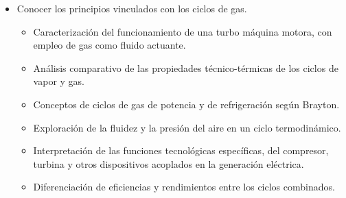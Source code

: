 \documentclass[../main]{subfiles}
\begin{document}
\begin{enumerate}
\begin{itemize}
        en los ciclos de vapor.
        \begin{itemize}
          \item Caracterización de las transformaciones de un sistema
            gaseoso.
          \item Interpretación del fenómeno de vaporización, a través de
            diagramas, representación, con usos de tablas de vapor.
          \item Conceptualización de la Entalpía del líquido y del vapor
            para el empleo tecnológico en máquinas refrigerantes.
          \item Comprensión de los fenómenos de vaporización e
            interpretación de las tablas de vapor.
          \item Conocimiento de los principios de Carnot relacionados
            con los ciclos de vapor.
          \item Reconocimiento de las características de diagramas,
            título de vapor, empleando los aportes técnicos de Mollier.
          \item Caracterización de los principios desarrollados por William
            John Rankine en los ciclos de vapor
          \item Reconocimiento de los efectos de presión y temperatura
            en los ciclos de vapor.
        \end{itemize}
      \item Conocer los principios vinculados con los ciclos de gas.
        \begin{itemize}
          \item Caracterización del funcionamiento de una turbo máquina
            motora, con empleo de gas como fluido actuante.
          \item Análisis comparativo de las propiedades técnico-térmicas
            de los ciclos de vapor y gas.
          \item Conceptos de ciclos de gas de potencia y de
            refrigeración según Brayton.
          \item Exploración de la fluidez y la presión del aire en un ciclo
            termodinámico.
          \item Interpretación de las funciones tecnológicas específicas,
            del compresor, turbina y otros dispositivos acoplados en la
            generación eléctrica.
          \item Diferenciación de eficiencias y rendimientos entre los
            ciclos combinados.
        \end{itemize}
    \end{itemize}
\end{enumerate}
\end{document}
